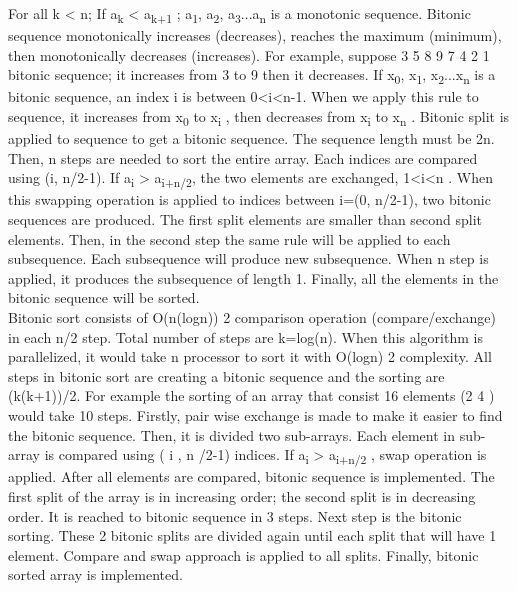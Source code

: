 \documentclass[conference]{IEEEtran}
\begin{document}
For all k < n; If a\textsubscript{k} < a\textsubscript{k+1} ; a\textsubscript{1}, a\textsubscript{2}, a\textsubscript{3}...a\textsubscript{n} is a monotonic
sequence. Bitonic sequence monotonically increases
(decreases), reaches the maximum (minimum), then
monotonically decreases (increases). For example, suppose 3
5 8 9 7 4 2 1 bitonic sequence; it increases from 3 to 9 then it
decreases. If x\textsubscript{0}, x\textsubscript{1}, x\textsubscript{2}...x\textsubscript{n} is a bitonic sequence, an index i is
between 0<i<n-1. When we apply this rule to sequence, it
increases from x\textsubscript{0} to x\textsubscript{i} , then decreases from x\textsubscript{i} to x\textsubscript{n} . Bitonic
split is applied to sequence to get a bitonic sequence. The
sequence length must be 2n. Then, n steps are needed to sort
the entire array. Each indices are compared using (i, n/2-1). If
a\textsubscript{i} > a\textsubscript{i+n/2}, the two elements are exchanged, 1<i<n . When
this swapping operation is applied to indices between i=(0,
n/2-1), two bitonic sequences are produced. The first split
elements are smaller than second split elements. Then, in the second step the same rule will be applied to
each subsequence. Each subsequence will produce new
subsequence. When n step is applied, it produces the
subsequence of length 1. Finally, all the elements in the
bitonic sequence will be sorted.\\

Bitonic sort consists of O(n(logn)) 2 comparison operation
(compare/exchange) in each n/2 step. Total number of steps
are k=log(n). When this algorithm is parallelized, it would
take n processor to sort it with O(logn) 2 complexity. All steps
in bitonic sort are creating a bitonic sequence and the sorting
are (k(k+1))/2. For example the sorting of an array that consist
16 elements (2 4 ) would take 10 steps. Firstly, pair wise exchange is made to
make it easier to find the bitonic sequence. Then, it is divided
two sub-arrays. Each element in sub-array is compared using
( i , n /2-1) indices. If a\textsubscript{i} > a\textsubscript{i+n/2} , swap operation is applied. After
all elements are compared, bitonic sequence is implemented.
The first split of the array is in increasing order; the second
split is in decreasing order. It is reached to bitonic sequence in
3 steps. Next step is the bitonic sorting. These 2 bitonic splits
are divided again until each split that will have 1 element.
Compare and swap approach is applied to all splits. Finally,
bitonic sorted array is implemented.\\
\end{document}
